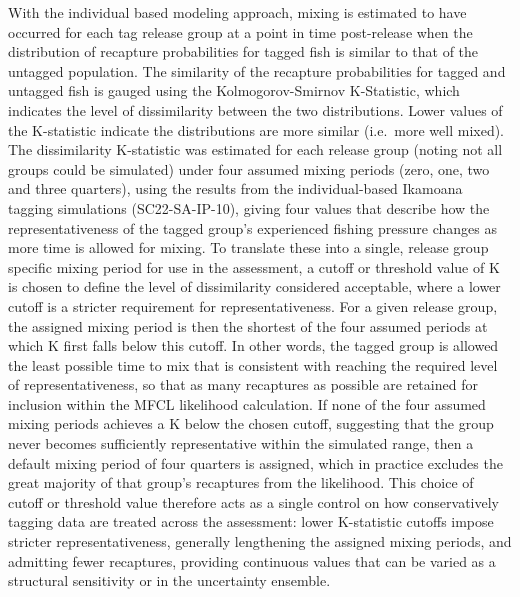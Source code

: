 \documentclass[
  english,
  a4paper,
  a4paper,
  11pt]{SCreport}
\newcounter{none} %
\begin{document}
With the individual based modeling approach, mixing is estimated to have
occurred for each tag release group at a point in time post-release when
the distribution of recapture probabilities for tagged fish is similar
to that of the untagged population. The similarity of the recapture
probabilities for tagged and untagged fish is gauged using the
Kolmogorov-Smirnov K-Statistic, which indicates the level of
dissimilarity between the two distributions. Lower values of the
K-statistic indicate the distributions are more similar (i.e.~more well
mixed). The dissimilarity K-statistic was estimated for each release
group (noting not all groups could be simulated) under four assumed
mixing periods (zero, one, two and three quarters), using the results
from the individual-based Ikamoana tagging simulations (SC22-SA-IP-10),
giving four values that describe how the representativeness of the
tagged group's experienced fishing pressure changes as more time is
allowed for mixing. To translate these into a single, release group
specific mixing period for use in the assessment, a cutoff or threshold
value of K is chosen to define the level of dissimilarity considered
acceptable, where a lower cutoff is a stricter requirement for
representativeness. For a given release group, the assigned mixing
period is then the shortest of the four assumed periods at which K first
falls below this cutoff. In other words, the tagged group is allowed the
least possible time to mix that is consistent with reaching the required
level of representativeness, so that as many recaptures as possible are
retained for inclusion within the MFCL likelihood calculation. If none
of the four assumed mixing periods achieves a K below the chosen cutoff,
suggesting that the group never becomes sufficiently representative
within the simulated range, then a default mixing period of four
quarters is assigned, which in practice excludes the great majority of
that group's recaptures from the likelihood. This choice of cutoff or
threshold value therefore acts as a single control on how conservatively
tagging data are treated across the assessment: lower K-statistic
cutoffs impose stricter representativeness, generally lengthening the
assigned mixing periods, and admitting fewer recaptures, providing
continuous values that can be varied as a structural sensitivity or in
the uncertainty ensemble.
\end{document}
